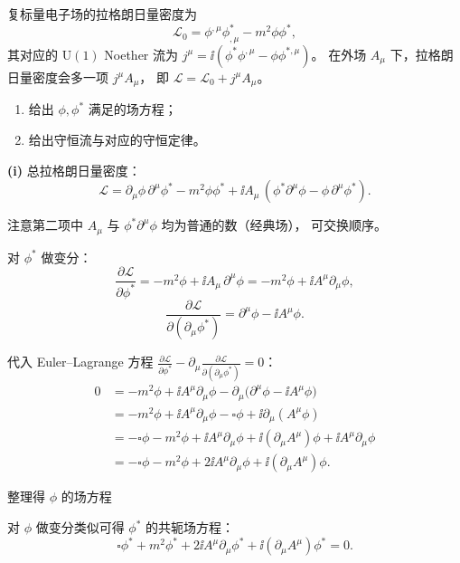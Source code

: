 \begin{question}[复标量电子场]
复标量电子场的拉格朗日量密度为
\[
\mathcal{L}_{0}=\phi^{,\mu}\phi_{,\mu}^{*}-m^{2}\phi\phi^{*},
\]
其对应的 $\mathrm{U}(1)$ Noether 流为
$j^{\mu}=\ii(\phi^{*}\phi^{,\mu}-\phi\phi^{*,\mu})$。
在外场 $A_{\mu}$ 下，拉格朗日量密度会多一项 $j^{\mu}A_{\mu}$，
即 $\mathcal{L}=\mathcal{L}_{0}+j^{\mu}A_{\mu}$。

\begin{enumerate}[label=(\roman*)]
  \item 给出 $\phi,\phi^{*}$ 满足的场方程；
  \item 给出守恒流与对应的守恒定律。
\end{enumerate}

\begin{solution}

\textbf{(i)} 总拉格朗日量密度：
\[
\mathcal{L}
=\partial_{\mu}\phi\,\partial^{\mu}\phi^{*}-m^{2}\phi\phi^{*}
+\ii A_{\mu}\,(\phi^{*}\partial^{\mu}\phi-\phi\,\partial^{\mu}\phi^{*}).
\]

注意第二项中 $A_{\mu}$ 与 $\phi^{*}\partial^{\mu}\phi$ 均为普通的数（经典场），
可交换顺序。

对 $\phi^{*}$ 做变分：
\[
\frac{\partial\mathcal{L}}{\partial\phi^{*}}
=-m^{2}\phi+\ii A_{\mu}\,\partial^{\mu}\phi
=-m^{2}\phi+\ii A^{\mu}\partial_{\mu}\phi,
\]
\[
\frac{\partial\mathcal{L}}{\partial(\partial_{\mu}\phi^{*})}
=\partial^{\mu}\phi-\ii A^{\mu}\phi.
\]

代入 Euler--Lagrange 方程
$\displaystyle\frac{\partial\mathcal{L}}{\partial\phi^{*}}
-\partial_{\mu}\frac{\partial\mathcal{L}}{\partial(\partial_{\mu}\phi^{*})}=0$：
\begin{align*}
0&=-m^{2}\phi+\ii A^{\mu}\partial_{\mu}\phi
-\partial_{\mu}\bigl(\partial^{\mu}\phi-\ii A^{\mu}\phi\bigr) \\
&=-m^{2}\phi+\ii A^{\mu}\partial_{\mu}\phi
-\square\phi+\ii\partial_{\mu}(A^{\mu}\phi) \\
&=-\square\phi-m^{2}\phi
+\ii A^{\mu}\partial_{\mu}\phi
+\ii(\partial_{\mu}A^{\mu})\phi+\ii A^{\mu}\partial_{\mu}\phi \\
&=-\square\phi-m^{2}\phi
+2\ii A^{\mu}\partial_{\mu}\phi+\ii(\partial_{\mu}A^{\mu})\phi.
\end{align*}

整理得 $\phi$ 的场方程


对 $\phi$ 做变分类似可得 $\phi^{*}$ 的共轭场方程：
\[
\square\phi^{*}+m^{2}\phi^{*}+2\ii A^{\mu}\partial_{\mu}\phi^{*}+\ii(\partial_{\mu}A^{\mu})\phi^{*}=0.
\]


\end{solution}
\end{question}
